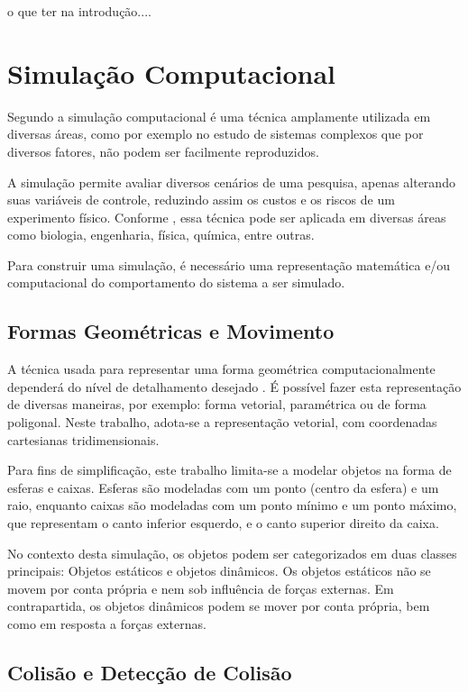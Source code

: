 \documentclass[12pt]{article}
\begin{document}
o que ter na introdução....

\section{Simulação Computacional}

Segundo \cite{duran2018computer} a simulação computacional é uma técnica amplamente utilizada em diversas áreas, como por exemplo no estudo de sistemas complexos que por diversos fatores, não podem ser facilmente reproduzidos.

A simulação permite avaliar diversos cenários de uma pesquisa, apenas alterando suas variáveis de controle, reduzindo assim os custos e os riscos de um experimento físico. Conforme \cite{marschner2018}, essa técnica pode ser aplicada em diversas áreas como biologia, engenharia, física, química, entre outras.

Para construir uma simulação, é necessário uma representação matemática e/ou computacional do comportamento do sistema a ser simulado.

\subsection{Formas Geométricas e Movimento}
A técnica usada para representar uma forma geométrica computacionalmente dependerá do nível de detalhamento desejado \cite{pharr2016}. É possível fazer esta representação de diversas maneiras, por exemplo: forma vetorial, paramétrica ou de forma poligonal. Neste trabalho, adota-se a representação vetorial, com coordenadas cartesianas tridimensionais.

Para fins de simplificação, este trabalho limita-se a modelar objetos na forma de esferas e caixas. Esferas são modeladas com um ponto (centro da esfera) e um raio, enquanto caixas são modeladas com um ponto mínimo e um ponto máximo, que representam o canto inferior esquerdo, e o canto superior direito da caixa.

No contexto desta simulação, os objetos podem ser categorizados em duas classes principais: Objetos estáticos e objetos dinâmicos. Os objetos estáticos não se movem por conta própria e nem sob influência de forças externas. Em contrapartida, os objetos dinâmicos podem se mover por conta própria, bem como em resposta a forças externas.

\subsection{Colisão e Detecção de Colisão}
\end{document}
